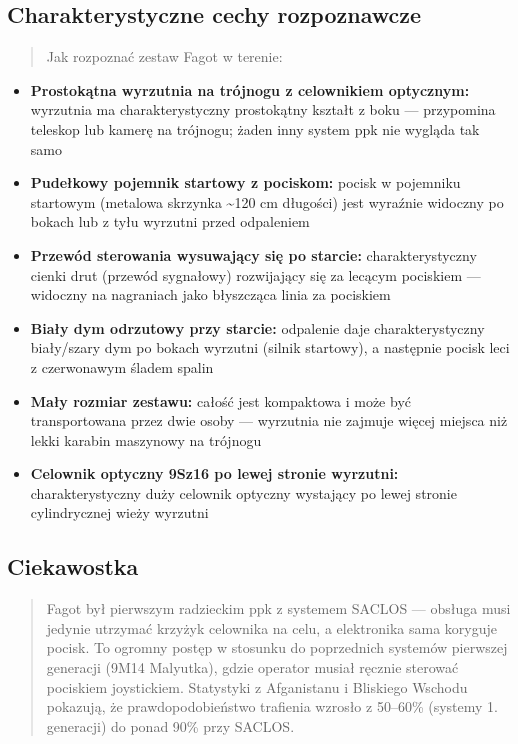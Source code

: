 \documentclass[12pt,oneside]{book}
\providecommand{\tightlist}{%
  \setlength{\itemsep}{0pt}\setlength{\parskip}{0pt}}
\begin{document}
\subsection{Charakterystyczne cechy
rozpoznawcze}\label{charakterystyczne-cechy-rozpoznawcze-49}

\begin{quote}
Jak rozpoznać zestaw Fagot w terenie:
\end{quote}

\begin{itemize}
\tightlist
\item
  \textbf{Prostokątna wyrzutnia na trójnogu z celownikiem optycznym:}
  wyrzutnia ma charakterystyczny prostokątny kształt z boku ---
  przypomina teleskop lub kamerę na trójnogu; żaden inny system ppk nie
  wygląda tak samo
\item
  \textbf{Pudełkowy pojemnik startowy z pociskom:} pocisk w pojemniku
  startowym (metalowa skrzynka \textasciitilde120 cm długości) jest
  wyraźnie widoczny po bokach lub z tyłu wyrzutni przed odpaleniem
\item
  \textbf{Przewód sterowania wysuwający się po starcie:}
  charakterystyczny cienki drut (przewód sygnałowy) rozwijający się za
  lecącym pociskiem --- widoczny na nagraniach jako błyszcząca linia za
  pociskiem
\item
  \textbf{Biały dym odrzutowy przy starcie:} odpalenie daje
  charakterystyczny biały/szary dym po bokach wyrzutni (silnik
  startowy), a następnie pocisk leci z czerwonawym śladem spalin
\item
  \textbf{Mały rozmiar zestawu:} całość jest kompaktowa i może być
  transportowana przez dwie osoby --- wyrzutnia nie zajmuje więcej
  miejsca niż lekki karabin maszynowy na trójnogu
\item
  \textbf{Celownik optyczny 9Sz16 po lewej stronie wyrzutni:}
  charakterystyczny duży celownik optyczny wystający po lewej stronie
  cylindrycznej wieży wyrzutni
\end{itemize}

\subsection{Ciekawostka}\label{ciekawostka-49}

\begin{quote}
Fagot był pierwszym radzieckim ppk z systemem SACLOS --- obsługa musi
jedynie utrzymać krzyżyk celownika na celu, a elektronika sama koryguje
pocisk. To ogromny postęp w stosunku do poprzednich systemów pierwszej
generacji (9M14 Malyutka), gdzie operator musiał ręcznie sterować
pociskiem joystickiem. Statystyki z Afganistanu i Bliskiego Wschodu
pokazują, że prawdopodobieństwo trafienia wzrosło z 50--60\% (systemy 1.
generacji) do ponad 90\% przy SACLOS.
\end{quote}
\end{document}
